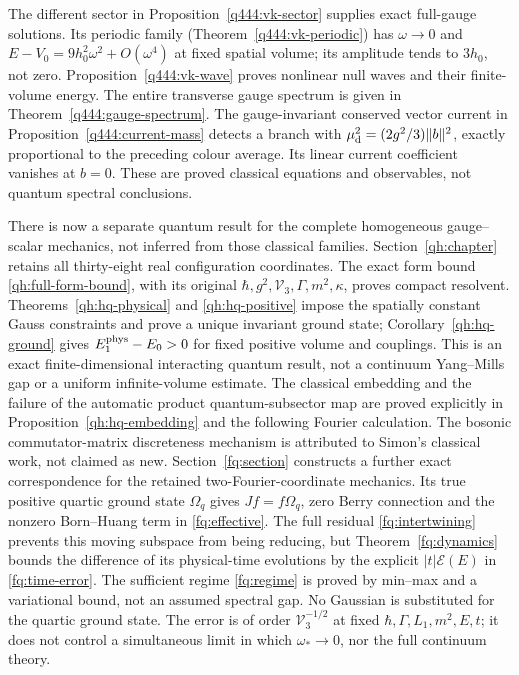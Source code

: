 The different sector in Proposition~\ref{q444:vk-sector} supplies
exact full-gauge solutions. Its periodic family
(Theorem~\ref{q444:vk-periodic}) has $\omega\to0$ and
$E-V_0=9h_0^2\omega^2+O(\omega^4)$ at fixed spatial volume;
its amplitude tends to $3h_0$, not zero.
Proposition~\ref{q444:vk-wave} proves nonlinear null waves and their
finite-volume energy. The entire transverse gauge spectrum is given in
Theorem~\ref{q444:gauge-spectrum}. The gauge-invariant conserved vector
current in Proposition~\ref{q444:current-mass} detects a branch with
$\mu_{\rm d}^2=(2g^2/3)\|b\|^2$, exactly proportional to the preceding
colour average. Its linear current coefficient vanishes at $b=0$.
These are proved classical equations and observables, not quantum
spectral conclusions.

There is now a separate quantum result for the complete homogeneous
gauge--scalar mechanics, not inferred from those classical families.
Section~\ref{qh:chapter} retains all thirty-eight real configuration
coordinates. The exact form bound \eqref{qh:full-form-bound}, with
its original $\hbar,g^2,\mathcal V_3,\Gamma,m^2,\kappa$, proves compact
resolvent. Theorems~\ref{qh:hq-physical} and \ref{qh:hq-positive}
impose the spatially constant Gauss constraints and prove a unique
invariant ground state; Corollary~\ref{qh:hq-ground} gives
$E^{\rm phys}_1-E_0>0$ for fixed positive volume and couplings.
This is an exact finite-dimensional interacting quantum result,
not a continuum Yang--Mills gap or a uniform infinite-volume estimate.
The classical embedding and the failure of the automatic product
quantum-subsector map are proved explicitly in
Proposition~\ref{qh:hq-embedding} and the following Fourier calculation.
The bosonic commutator-matrix discreteness mechanism is attributed
to Simon's classical work, not claimed as new.
Section~\ref{fq:section} constructs a further exact correspondence for
the retained two-Fourier-coordinate mechanics. Its true positive
quartic ground state $\Omega_q$ gives $Jf=f\Omega_q$, zero Berry
connection and the nonzero Born--Huang term in \eqref{fq:effective}.
The full residual \eqref{fq:intertwining} prevents this moving
subspace from being reducing, but Theorem~\ref{fq:dynamics} bounds
the difference of its physical-time evolutions by the explicit
$|t|\mathcal E(E)$ in \eqref{fq:time-error}. The sufficient regime
\eqref{fq:regime} is proved by min--max and a variational bound,
not an assumed spectral gap. No Gaussian is substituted for the
quartic ground state. The error is of order $\mathcal V_3^{-1/2}$
at fixed $\hbar,\Gamma,L_1,m^2,E,t$; it does not control a simultaneous
limit in which $\omega_*\to0$, nor the full continuum theory.

